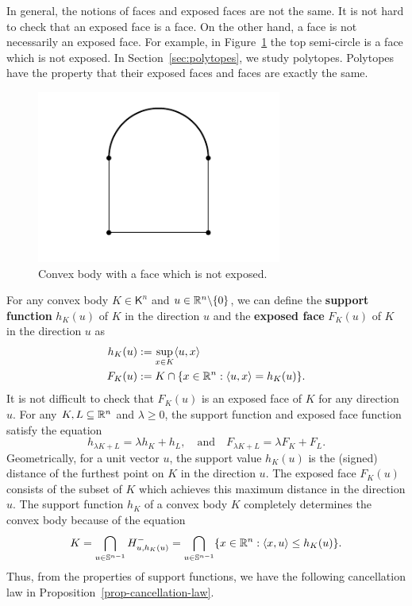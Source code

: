 \documentclass{puthesis-UG}
\begin{document}
\begin{remark}
	In general, the notions of faces and exposed faces are not the same. It is not hard to check that an exposed face is a face. On the other hand, a face is not necessarily an exposed face. For example, in Figure~\ref{counter-example} the top semi-circle is a face which is not exposed. In Section~\ref{sec:polytopes}, we study polytopes. Polytopes have the property that their exposed faces and faces are exactly the same.
	\begin{figure}[h] \label{counter-example}
		\begin{center}
			\includegraphics[scale = 1]{image5.PNG}
			\caption{Convex body with a face which is not exposed.}
		\end{center}
	\end{figure}
\end{remark}
For any convex body $K \in \mathsf{K}^n$ and $u \in \mathbb{R}^n \backslash \{0\}$, we can define the \textbf{support function} $h_K(u)$ of $K$ in the direction $u$ and the \textbf{exposed face} $F_K(u)$ of $K$ in the direction $u$ as 
\begin{align*}
	h_K(u) & := \sup_{x \in K} \langle u, x \rangle \\
	F_K(u) & := K \cap \{x \in \mathbb{R}^n : \langle u, x \rangle = h_K(u)\}.
\end{align*}
It is not difficult to check that $F_K(u)$ is an exposed face of $K$ for any direction $u$. For any $K, L \subseteq \mathbb{R}^n$ and $\lambda \geq 0$, the support function and exposed face function satisfy the equation
\[
	h_{\lambda K+L} = \lambda h_K + h_L, \quad \text{and} \quad F_{\lambda K+L} = \lambda F_K + F_L.
\]
Geometrically, for a unit vector $u$, the support value $h_K(u)$ is the (signed) distance of the furthest point on $K$ in the direction $u$. The exposed face $F_K(u)$ consists of the subset of $K$ which achieves this maximum distance in the direction $u$. The support function $h_K$ of a convex body $K$ completely determines the convex body because of the equation 
\[
	K = \bigcap_{u \in \mathbb{S}^{n-1}} H^{-}_{u, h_K(u)} = \bigcap_{u \in \mathbb{S}^{n-1}} \{x \in \mathbb{R}^n : \langle x, u \rangle \leq h_K(u)\}.
\]
Thus, from the properties of support functions, we have the following cancellation law in Proposition~\ref{prop-cancellation-law}.
\end{document}
